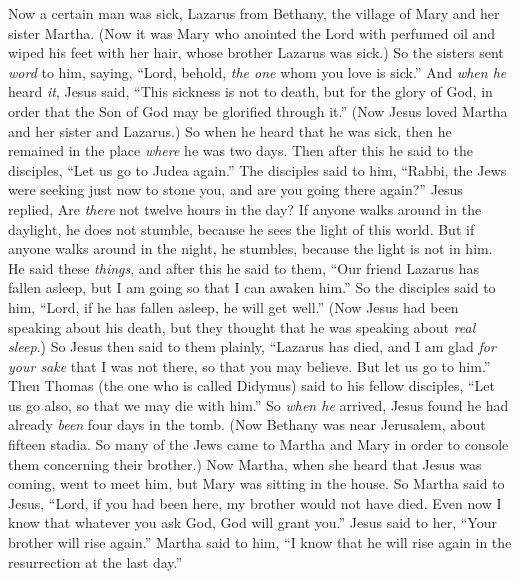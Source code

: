 \begin{biblechapter} %
 Now a certain man was sick, Lazarus from Bethany, the village of Mary and her sister Martha.
\verse (Now it was Mary who anointed the Lord with perfumed oil and wiped his feet with her hair, whose brother Lazarus was sick.)
\verse So the sisters sent \textit{word} to him, saying, “Lord, behold, \textit{the one} whom you love is sick.”
\verse And \textit{when he} heard \textit{it}, Jesus said, “This sickness is not to death, but for the glory of God, in order that the Son of God may be glorified through it.”
\verse (Now Jesus loved Martha and her sister and Lazarus.)
\verse So when he heard that he was sick, then he remained in the place \textit{where} he was two days.
\verse Then after this he said to the disciples, “Let us go to Judea again.”
\verse The disciples said to him, “Rabbi, the Jews were seeking just now to stone you, and are you going there again?”
\verse Jesus replied, Are \textit{there} not twelve hours in the day? If anyone walks around in the daylight, he does not stumble, because he sees the light of this world.
\verse But if anyone walks around in the night, he stumbles, because the light is not in him.
\verse He said these \textit{things}, and after this he said to them, “Our friend Lazarus has fallen asleep, but I am going so that I can awaken him.”
\verse So the disciples said to him, “Lord, if he has fallen asleep, he will get well.”
\verse (Now Jesus had been speaking about his death, but they thought that he was speaking about \textit{real sleep}.)
\verse So Jesus then said to them plainly, “Lazarus has died,
\verse and I am glad \textit{for your sake} that I was not there, so that you may believe. But let us go to him.”
\verse Then Thomas (the one who is called Didymus) said to his fellow disciples, “Let us go also, so that we may die with him.”
 So \textit{when he} arrived, Jesus found he had already \textit{been} four days in the tomb.
\verse (Now Bethany was near Jerusalem, about fifteen stadia.
\verse So many of the Jews came to Martha and Mary in order to console them concerning their brother.)
\verse Now Martha, when she heard that Jesus was coming, went to meet him, but Mary was sitting in the house.
\verse So Martha said to Jesus, “Lord, if you had been here, my brother would not have died.
\verse Even now I know that whatever you ask God, God will grant you.”
\verse Jesus said to her, “Your brother will rise again.”
\verse Martha said to him, “I know that he will rise again in the resurrection at the last day.”

\end{biblechapter}
